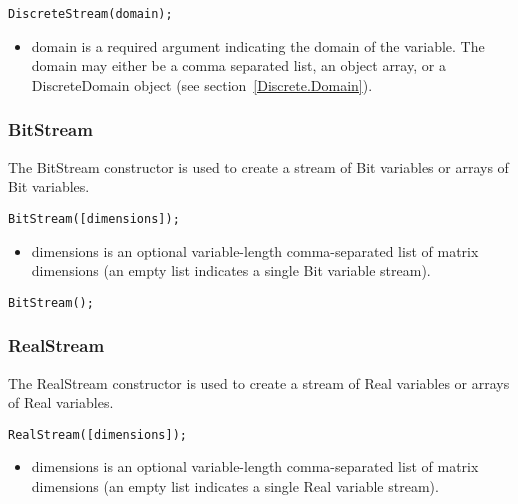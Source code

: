 \fi

\ifjava
\begin{lstlisting}
DiscreteStream(domain);
\end{lstlisting}

\begin{itemize}
\item domain is a required argument indicating the domain of the variable.  The domain may either be a comma separated list, an object array, or a DiscreteDomain object (see section~\ref{Discrete.Domain}).
\end{itemize}
\fi

\subsubsection{BitStream}


The BitStream constructor is used to create a stream of Bit variables or arrays of Bit variables.

\ifmatlab
\begin{lstlisting}
BitStream([dimensions]);
\end{lstlisting}

\begin{itemize}
\item dimensions is an optional variable-length comma-separated list of matrix dimensions (an empty list indicates a single Bit variable stream).
\end{itemize}
\fi

\ifjava
\begin{lstlisting}
BitStream();
\end{lstlisting}
\fi

\subsubsection{RealStream}


The RealStream constructor is used to create a stream of Real variables or arrays of Real variables.

\ifmatlab
\begin{lstlisting}
RealStream([dimensions]);
\end{lstlisting}

\begin{itemize}
\item dimensions is an optional variable-length comma-separated list of matrix dimensions (an empty list indicates a single Real variable stream).
\end{itemize}
\fi

